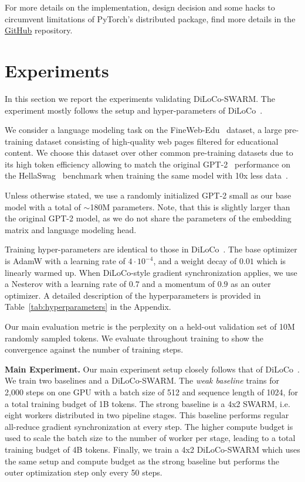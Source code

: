 \documentclass{article}
\begin{document}
For more details on the implementation, design decision and some hacks to
circumvent limitations of PyTorch's distributed package, find more details in
the \href{https://github.com/mikasenghaas/swarm}{GitHub} repository.

\section{Experiments}

In this section we report the experiments validating DiLoCo-SWARM. The experiment
mostly follows the setup and hyper-parameters of DiLoCo~\cite{douillard2023}.

We consider a language modeling task on the FineWeb-Edu~\cite{penedo2024}
dataset, a large pre-training dataset consisting of high-quality web pages
filtered for educational content. We choose this dataset over other common
pre-training datasets due to its high token efficiency allowing to match the
original GPT-2~\cite{radford2019} performance on the
HellaSwag~\cite{zellers2019} benchmark when training the same model with 10x
less data~\cite{karpathy2024}.

Unless otherwise stated, we use a randomly initialized GPT-2 small as our base
model with a total of $\sim$180M parameters. Note, that this is slightly larger
than the original GPT-2 model, as we do not share the parameters of the embedding
matrix and language modeling head.

Training hyper-parameters are identical to those in DiLoCo~\cite{douillard2023}.
The base optimizer is AdamW with a learning rate of $4\cdot 10^{-4}$, and a
weight decay of $0.01$ which is linearly warmed up. When DiLoCo-style gradient
synchronization applies, we use a Nesterov with a learning rate of $0.7$ and a
momentum of $0.9$ as an outer optimizer. A detailed description of the
hyperparameters is provided in Table~\ref{tab:hyperparameters} in the Appendix.

Our main evaluation metric is the perplexity on a held-out validation set of 10M
randomly sampled tokens. We evaluate throughout training to show the convergence
against the number of training steps.

\textbf{Main Experiment.} Our main experiment setup closely follows that of
DiLoCo~\cite{douillard2023}. We train two baselines and a DiLoCo-SWARM. The
\textit{weak baseline} trains for 2,000 steps on one GPU with a batch size of
512 and sequence length of 1024, for a total training budget of 1B tokens. The 
strong baseline is a 4x2 SWARM, i.e. eight workers distributed in two pipeline 
stages. This baseline performs regular all-reduce gradient synchronization at
every step. The higher compute budget is used to scale the batch size to the
number of worker per stage, leading to a total training budget of 4B tokens.
Finally, we train a 4x2 DiLoCo-SWARM which uses the same setup and compute
budget as the strong baseline but performs the outer optimization step only
every 50 steps.
\end{document}
